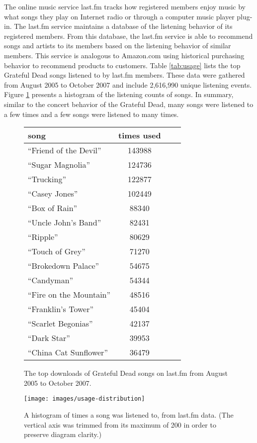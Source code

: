 \documentclass{svmult}
\newcommand{\ttt}[1]{``#1''}
\begin{document}
The online music service last.fm tracks how registered members enjoy music by what songs they play on Internet radio or through a computer music player plug-in.  The last.fm service maintains a database of the listening behavior of its registered members. From this database, the last.fm service is able to recommend songs and artists to its members based on the listening behavior of similar members.  This service is analogous to Amazon.com using historical purchasing behavior to recommend products to customers. Table \ref{tab:usage} lists the top  Grateful Dead songs listened to by last.fm members. These data were gathered from August 2005 to October 2007 and include 2,616,990 unique listening events.  Figure \ref{fig:usage-distribution} presents a histogram of the listening counts of songs. In summary, similar to the concert behavior of the Grateful Dead, many songs were listened to a few times and a few songs were listened to many times.
\begin{figure}
    \begin{minipage}{2.75in}\begin{center}
\begin{footnotesize}
\begin{tabular}{lcll|}
\hline
\textbf{song}&\textbf{times used}\\\hline
\ttt{Friend of the Devil}&143988\\
\ttt{Sugar Magnolia}&124736\\
\ttt{Trucking}&122877\\
\ttt{Casey Jones}&102449\\
\ttt{Box of Rain}&88340\\
\ttt{Uncle John's Band}&82431\\
\ttt{Ripple}&80629\\
\ttt{Touch of Grey}&71270\\
\ttt{Brokedown Palace}&54675\\
\ttt{Candyman}&54344\\
\ttt{Fire on the Mountain}&48516\\
\ttt{Franklin's Tower}&45404\\
\ttt{Scarlet Begonias}&42137\\
\ttt{Dark Star}&39953\\
\ttt{China Cat Sunflower}&36479\\
\hline
\end{tabular}
\caption{\label{tab:usage}The top  downloads of Grateful Dead songs on last.fm from August 2005 to October 2007.}
\end{footnotesize}
\end{center}
\end{minipage}
\qquad
\begin{minipage}{2.75in}\begin{center}
\texttt{[image: images/usage-distribution]}
\caption{\label{fig:usage-distribution}A histogram of times a song was listened to, from last.fm data. (The vertical axis was trimmed from its maximum of 200 in order to preserve diagram clarity.)}
\end{center}
\end{minipage}
\end{figure}
\end{document}
